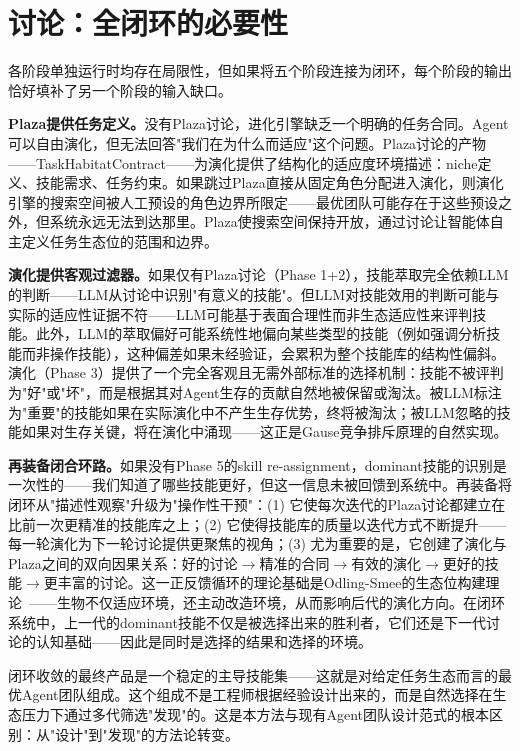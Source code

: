\documentclass[conference]{IEEEtran}
\begin{document}
\section{讨论：全闭环的必要性}

各阶段单独运行时均存在局限性，但如果将五个阶段连接为闭环，每个阶段的输出恰好填补了另一个阶段的输入缺口。

\textbf{Plaza提供任务定义。}没有Plaza讨论，进化引擎缺乏一个明确的任务合同。Agent可以自由演化，但无法回答"我们在为什么而适应"这个问题。Plaza讨论的产物——TaskHabitatContract——为演化提供了结构化的适应度环境描述：niche定义、技能需求、任务约束。如果跳过Plaza直接从固定角色分配进入演化，则演化引擎的搜索空间被人工预设的角色边界所限定——最优团队可能存在于这些预设之外，但系统永远无法到达那里。Plaza使搜索空间保持开放，通过讨论让智能体自主定义任务生态位的范围和边界。

\textbf{演化提供客观过滤器。}如果仅有Plaza讨论（Phase 1+2），技能萃取完全依赖LLM的判断——LLM从讨论中识别"有意义的技能"。但LLM对技能效用的判断可能与实际的适应性证据不符——LLM可能基于表面合理性而非生态适应性来评判技能。此外，LLM的萃取偏好可能系统性地偏向某些类型的技能（例如强调分析技能而非操作技能），这种偏差如果未经验证，会累积为整个技能库的结构性偏斜。演化（Phase 3）提供了一个完全客观且无需外部标准的选择机制：技能不被评判为"好"或"坏"，而是根据其对Agent生存的贡献自然地被保留或淘汰。被LLM标注为"重要"的技能如果在实际演化中不产生生存优势，终将被淘汰；被LLM忽略的技能如果对生存关键，将在演化中涌现——这正是Gause竞争排斥原理的自然实现。

\textbf{再装备闭合环路。}如果没有Phase 5的skill re-assignment，dominant技能的识别是一次性的——我们知道了哪些技能更好，但这一信息未被回馈到系统中。再装备将闭环从"描述性观察"升级为"操作性干预"：(1) 它使每次迭代的Plaza讨论都建立在比前一次更精准的技能库之上；(2) 它使得技能库的质量以迭代方式不断提升——每一轮演化为下一轮讨论提供更聚焦的视角；(3) 尤为重要的是，它创建了演化与Plaza之间的双向因果关系：好的讨论$\to$精准的合同$\to$有效的演化$\to$更好的技能$\to$更丰富的讨论。这一正反馈循环的理论基础是Odling-Smee的生态位构建理论~\cite{odling2003niche}——生物不仅适应环境，还主动改造环境，从而影响后代的演化方向。在闭环系统中，上一代的dominant技能不仅是被选择出来的胜利者，它们还是下一代讨论的认知基础——因此是同时是选择的结果和选择的环境。

闭环收敛的最终产品是一个稳定的主导技能集——这就是对给定任务生态而言的最优Agent团队组成。这个组成不是工程师根据经验设计出来的，而是自然选择在生态压力下通过多代筛选"发现"的。这是本方法与现有Agent团队设计范式的根本区别：从"设计"到"发现"的方法论转变。
\end{document}
